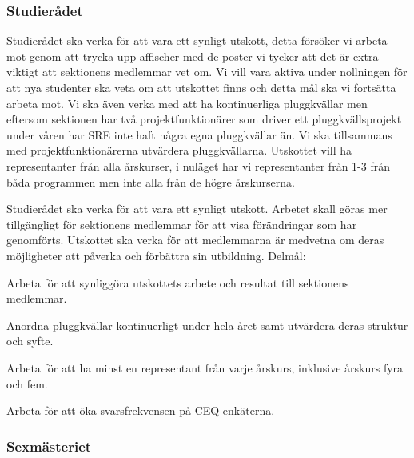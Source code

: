 \documentclass[../_main/handlingar.tex]{subfiles}
\begin{document}
\subsubsection*{Studierådet}
Studierådet ska verka för att vara ett synligt utskott, detta försöker vi arbeta mot genom att trycka upp affischer med de poster vi tycker att det är extra viktigt att sektionens medlemmar vet om. Vi vill vara aktiva under nollningen för att nya studenter ska veta om att utskottet finns och detta mål ska vi fortsätta arbeta mot. Vi ska även verka med att ha kontinuerliga pluggkvällar men eftersom sektionen har två projektfunktionärer som driver ett pluggkvällsprojekt under våren har SRE inte haft några egna pluggkvällar än. Vi ska tillsammans med projektfunktionärerna utvärdera pluggkvällarna. Utskottet vill ha representanter från alla årskurser, i nuläget har vi representanter från 1-3 från båda programmen men inte alla från de högre årskurserna.  

Studierådet ska verka för att vara ett synligt utskott. Arbetet skall göras mer tillgängligt för sektionens medlemmar för att visa förändringar som har genomförts. Utskottet ska verka för att medlemmarna är medvetna om deras möjligheter att påverka och förbättra sin utbildning.
Delmål:
\begin{dashlist}
    \item Arbeta för att synliggöra utskottets arbete och resultat till sektionens medlemmar. 
    \item Anordna pluggkvällar kontinuerligt under hela året samt utvärdera deras struktur och syfte.
    \item Arbeta för att ha minst en representant från varje årskurs, inklusive årskurs fyra och fem.
    \item Arbeta för att öka svarsfrekvensen på CEQ-enkäterna.
\end{dashlist}

\subsubsection*{Sexmästeriet}
\end{document}
